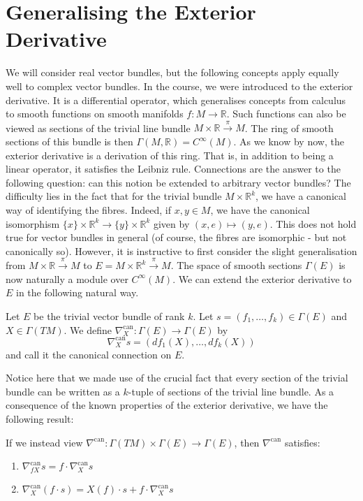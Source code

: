 \section{Generalising the Exterior Derivative}

We will consider real vector bundles, but the following concepts apply equally well to complex vector bundles. In the course, we were introduced to the exterior derivative. It is a differential operator, which generalises concepts from calculus to smooth functions on smooth manifolds $f:M\to\mathbb{R}$. Such functions can also be viewed as sections of the trivial line bundle $M\times\mathbb{R}\xrightarrow{\pi}M$. The ring of smooth sections of this bundle is then $\Gamma(M,\mathbb{R})=C^\infty(M)$. As we know by now, the exterior derivative is a derivation of this ring. That is, in addition to being a linear operator, it satisfies the Leibniz rule. Connections are the answer to the following question: can this notion be extended to arbitrary vector bundles? The difficulty lies in the fact that for the trivial bundle $M\times\mathbb{R}^k$, we have a canonical way of identifying the fibres. Indeed, if $x,y\in M$, we have the canonical isomorphism $\{x\}\times\mathbb{R}^k\to\{y\}\times\mathbb{R}^k$ given by $(x,e)\mapsto (y,e)$. This does not hold true for vector bundles in general (of course, the fibres are isomorphic - but not canonically so). However, it is instructive to first consider the slight generalisation from $M\times\mathbb{R}\xrightarrow{\pi}M$ to $E=M\times\mathbb{R}^k\xrightarrow{\pi}M$. The space of smooth sections $\Gamma(E)$ is now naturally a module over $C^\infty(M)$. We can extend the exterior derivative to $E$ in the following natural way.
\begin{definition}
  Let $E$ be the trivial vector bundle of rank $k$. Let $s=(f_1,\dots,f_k)\in\Gamma(E)$ and $X\in\Gamma(TM)$. We define $\nabla^\text{can}_X:\Gamma(E)\to\Gamma(E)$ by $$\nabla^\text{can}_Xs=(df_1(X),\dots,df_k(X))$$
  and call it the canonical connection on $E$.
\end{definition} 
Notice here that we made use of the crucial fact that every section of the trivial bundle can be written as a $k$-tuple of sections of the trivial line bundle. As a consequence of the known properties of the exterior derivative, we have the following result:
\begin{proposition}
  If we instead view $\nabla^\text{can}:\Gamma(TM)\times\Gamma(E)\to\Gamma(E)$, then $\nabla^\text{can}$ satisfies:
  \begin{enumerate}
    \item $\nabla_{fX}^\text{can}s=f\cdot\nabla^\text{can}_Xs$
    \item $\nabla^\text{can}_X(f\cdot s)=X(f)\cdot s+f\cdot\nabla^\text{can}_Xs$
  \end{enumerate}
\end{proposition}
